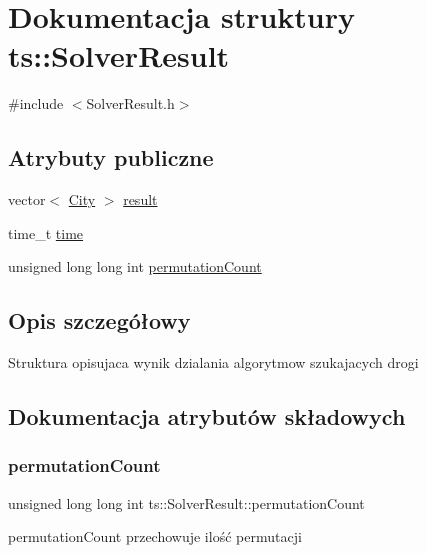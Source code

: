 \hypertarget{structts_1_1_solver_result}{}\section{Dokumentacja struktury ts\+:\+:Solver\+Result}
\label{structts_1_1_solver_result}


{\ttfamily \#include $<$Solver\+Result.\+h$>$}

\subsection*{Atrybuty publiczne}
\begin{DoxyCompactItemize}
\item 
vector$<$ \mbox{\hyperlink{classts_1_1_city}{City}} $>$ \mbox{\hyperlink{structts_1_1_solver_result_aa6bbb18c7846f641eda9c690e833aedd}{result}}
\item 
time\+\_\+t \mbox{\hyperlink{structts_1_1_solver_result_a67b394211ddb67c3350920de2596fecf}{time}}
\item 
unsigned long long int \mbox{\hyperlink{structts_1_1_solver_result_ab284eb0df37ea9d104e2a1fbf918f518}{permutation\+Count}}
\end{DoxyCompactItemize}


\subsection{Opis szczegółowy}
Struktura opisujaca wynik dzialania algorytmow szukajacych drogi 

\subsection{Dokumentacja atrybutów składowych}
\mbox{\label{structts_1_1_solver_result_ab284eb0df37ea9d104e2a1fbf918f518}} 
\subsubsection{\texorpdfstring{permutation\+Count}{permutationCount}}
{\footnotesize\ttfamily unsigned long long int ts\+::\+Solver\+Result\+::permutation\+Count}

permutation\+Count przechowuje ilość permutacji \mbox{\label{structts_1_1_solver_result_aa6bbb18c7846f641eda9c690e833aedd}} 
